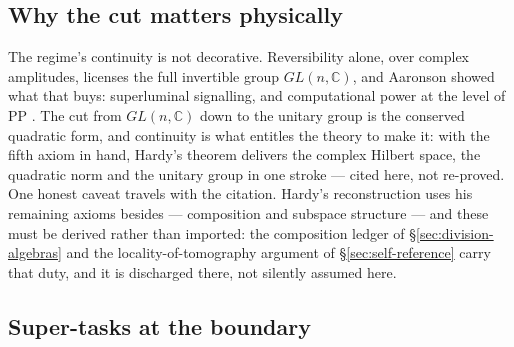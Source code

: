 \subsection{Why the cut matters physically}

The regime's continuity is not decorative. Reversibility alone, over complex amplitudes, licenses
the full invertible group $GL(n, \mathbb{C})$, and Aaronson showed what that buys: superluminal
signalling, and computational power at the level of \textsf{PP} \autocite{Aaronson2004h}. The cut
from $GL(n, \mathbb{C})$ down to the unitary group is the conserved quadratic form, and continuity
is what entitles the theory to make it: with the fifth axiom in hand, Hardy's theorem delivers the
complex Hilbert space, the quadratic norm and the unitary group in one stroke \autocite{Hardy2001a}
--- cited here, not re-proved. One honest caveat travels with the citation. Hardy's reconstruction
uses his remaining axioms besides --- composition and subspace structure --- and these must be
derived rather than imported: the composition ledger of \S\ref{sec:division-algebras} and the
locality-of-tomography argument of \S\ref{sec:self-reference} carry that duty, and it is discharged
there, not silently assumed here.

\subsection{Super-tasks at the boundary}

